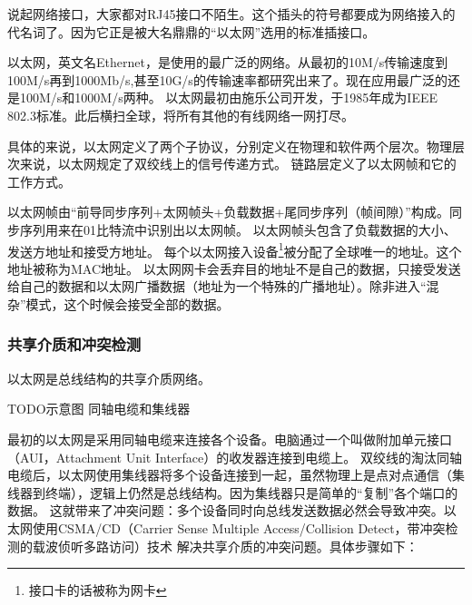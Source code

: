 说起网络接口，大家都对RJ45接口不陌生。这个插头的符号都要成为网络接入的代名词了。因为它正是被大名鼎鼎的“以太网”选用的标准插接口。



以太网，英文名Ethernet，是使用的最广泛的网络。从最初的10M/s传输速度到100M/s再到1000Mb/s,甚至10G/s的传输速率都研究出来了。现在应用最广泛的还是100M/s和1000M/s两种。
以太网最初由施乐公司开发，于1985年成为IEEE 802.3标准。此后横扫全球，将所有其他的有线网络一网打尽。

具体的来说，以太网定义了两个子协议，分别定义在物理和软件两个层次。物理层次来说，以太网规定了双绞线上的信号传递方式。%
链路层定义了以太网帧和它的工作方式。

以太网帧由“前导同步序列+太网帧头+负载数据+尾同步序列（帧间隙）”构成。同步序列用来在01比特流中识别出以太网帧。
以太网帧头包含了负载数据的大小、发送方地址和接受方地址。
每个以太网接入设备\footnote{接口卡的话被称为网卡}被分配了全球唯一的地址。这个地址被称为MAC地址。
以太网网卡会丢弃目的地址不是自己的数据，只接受发送给自己的数据和以太网广播数据（地址为一个特殊的广播地址）。除非进入“混杂”模式，这个时候会接受全部的数据。

\subsubsection{共享介质和冲突检测}

以太网是总线结构的共享介质网络。

TODO示意图 同轴电缆和集线器 %

最初的以太网是采用同轴电缆来连接各个设备。电脑通过一个叫做附加单元接口（AUI，Attachment Unit Interface）的收发器连接到电缆上。
双绞线的淘汰同轴电缆后，以太网使用集线器将多个设备连接到一起，虽然物理上是点对点通信（集线器到终端），逻辑上仍然是总线结构。因为集线器只是简单的“复制”各个端口的数据。
这就带来了冲突问题：多个设备同时向总线发送数据必然会导致冲突。以太网使用CSMA/CD（Carrier Sense Multiple Access/Collision Detect，带冲突检测的载波侦听多路访问）技术
解决共享介质的冲突问题。具体步骤如下：


